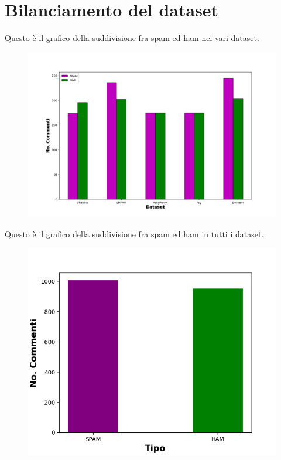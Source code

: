 \documentclass{report}
\begin{document}
   

    \section{Bilanciamento del dataset}
    
    
    Questo è il grafico della suddivisione fra spam ed ham nei vari dataset.
    \begin{figure}[h]
        \centering
        \includegraphics[width = \textwidth]{immagini/DatasetSeparati.png}

    \end{figure}

    Questo è il grafico della suddivisione fra spam ed ham in tutti i dataset.


    \begin{figure}[h!]
        \centering
        \includegraphics[height = 0.6\textwidth]{immagini/DatasetUnico.png}
    \end{figure}
\end{document}
